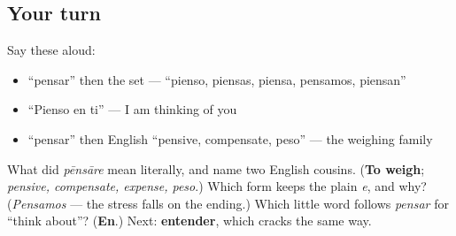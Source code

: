 \subsection*{Your turn}
Say these aloud:

\begin{itemize}
\raggedright
  \item \textquotedblleft{}pensar\textquotedblright{} then the set — \textquotedblleft{}pienso, piensas, piensa, pensamos, piensan\textquotedblright{}
  \item \textquotedblleft{}Pienso en ti\textquotedblright{} — I am thinking of you
  \item \textquotedblleft{}pensar\textquotedblright{} then English \textquotedblleft{}pensive, compensate, peso\textquotedblright{} — the weighing family
\end{itemize}

\begin{tcolorbox}[breakable,colback=teal!4,colframe=teal!35!black,title={Before you move on}]
What did \emph{pēnsāre} mean literally, and name two English cousins. (\textbf{To weigh}; \emph{pensive, compensate, expense, peso}.) Which form keeps the plain \emph{e}, and why? (\emph{Pensamos} — the stress falls on the ending.) Which little word follows \emph{pensar} for \textquotedblleft{}think about\textquotedblright{}? (\textbf{En}.) Next: \textbf{entender}, which cracks the same way.
\end{tcolorbox}
